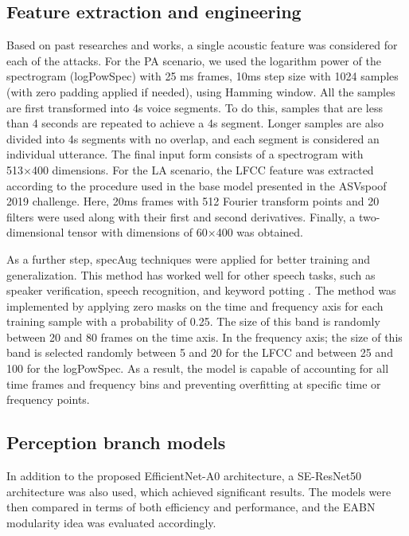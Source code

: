 \documentclass[a4paper]{article}
\begin{document}
\subsection{Feature extraction and engineering}
Based on past researches and works, a single acoustic feature was considered for each of the attacks. For the PA scenario, we used the logarithm power of the spectrogram (logPowSpec) with 25 ms frames, 10ms step size with 1024 samples (with zero padding applied if needed), using Hamming window. All the samples are first transformed into 4s voice segments. To do this, samples that are less than 4 seconds are repeated to achieve a 4s segment. Longer samples are also divided into 4s segments with no overlap, and each segment is considered an individual utterance. The final input form consists of a spectrogram with 513×400 dimensions. For the LA scenario, the LFCC feature was extracted according to the procedure used in the base model presented in the ASVspoof 2019 challenge. Here, 20ms frames with 512 Fourier transform points and 20 filters were used along with their first and second derivatives. Finally, a two-dimensional tensor with dimensions of 60×400 was obtained. 

As a further step, specAug \cite{26park2019specaugment} techniques were applied for better training and generalization. This method has worked well for other speech tasks, such as speaker verification, speech recognition, and keyword potting \cite{21rostami2020efficientnet}. The method was implemented by applying zero masks on the time and frequency axis for each training sample with a probability of 0.25. The size of this band is randomly between 20 and 80 frames on the time axis. In the frequency axis; the size of this band is selected randomly between 5 and 20 for the LFCC and between 25 and 100 for the logPowSpec. As a result, the model is capable of accounting for all time frames and frequency bins and preventing overfitting at specific time or frequency points.
\subsection{Perception branch models}
In addition to the proposed EfficientNet-A0 architecture, a SE-ResNet50 architecture was also used, which achieved significant results. The models were then compared in terms of both efficiency and performance, and the EABN modularity idea was evaluated accordingly.
\end{document}
